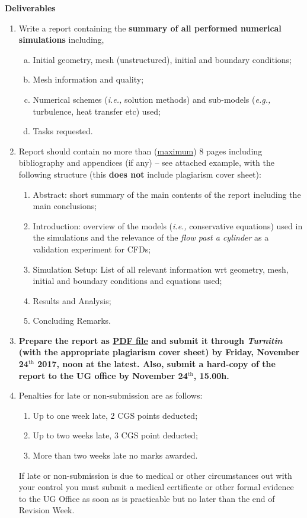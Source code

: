 \documentclass[12pts,a4paper,amsmath,amssymb,floatfix]{article}%
\newcommand{\eg}{{\it e.g., }}
\newcommand{\ie}{{\it i.e., }}
\begin{document}
\clearpage
\begin{center} \Large{\bf Deliverables}\end{center}
\begin{enumerate}[1)]
  \item Write a report containing the {\bf summary of all performed numerical simulations} including,
       \begin{enumerate} [(a)]
          \item Initial geometry, mesh (unstructured), initial and boundary conditions;
          \item Mesh information and quality;
          \item Numerical schemes (\ie solution methods) and sub-models (\eg turbulence, heat transfer etc) used;
          \item Tasks requested.
     \end{enumerate}

     \item Report should contain no more than (\underline{maximum}) 8 pages including bibliography and appendices (if any) -- see attached example, with the following structure (this {\bf does not} include plagiarism cover sheet):
       \begin{enumerate}
          \item Abstract: short summary of the main contents of the report including the main conclusions;
          \item Introduction: overview of the models (\ie conservative equations) used in the simulations and the relevance of the {\it flow past a cylinder} as a validation experiment for CFDs;
          \item Simulation Setup: List of all relevant information wrt geometry, mesh, initial and boundary conditions and equations used;
          \item Results and Analysis;
          \item Concluding Remarks.
       \end{enumerate}


\item {\bf Prepare the report as \underline{PDF file} and submit it through {\it Turnitin} (with the appropriate plagiarism cover sheet) by Friday, November 24$^{\text{th}}$ 2017, noon at the latest. Also, submit a hard-copy of the report to the UG office by November 24$^{\text{th}}$, 15.00h.}
%
%
\item Penalties for late or non-submission are as follows:
\begin{enumerate}%
  \item Up to one week late, 2 CGS points deducted;
  \item Up to two weeks late, 3 CGS point deducted;
  \item More than two weeks late no marks awarded.
\end{enumerate}
If late or non-submission is due to medical or other circumstances out with your control you must submit a medical certificate or other formal evidence to the UG Office as soon as is practicable but no later than the end of Revision Week.


\end{enumerate}
\end{document}
